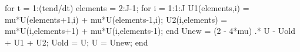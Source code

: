 for t = 1:(tend/dt)
    elements = 2:J-1;  
    for i = 1:1:J
        U1(elements,i) = mu*U(elements+1,i) + mu*U(elements-1,i); 
        U2(i,elements) = mu*U(i,elements+1) + mu*U(i,elements-1);
    end
    Unew = (2 - 4*mu) .* U - Uold + U1 + U2;
    Uold = U;
    U = Unew;
end